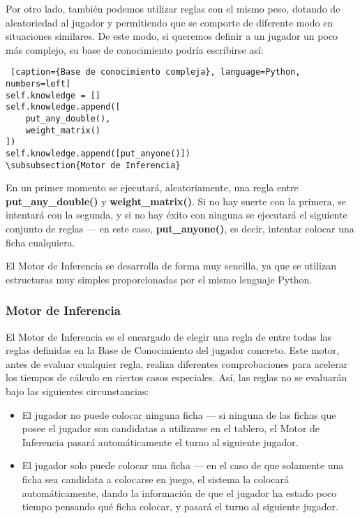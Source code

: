 Por otro lado, también podemos utilizar reglas con el mismo peso, dotando de aleatoriedad al jugador y permitiendo
que se comporte de diferente modo en situaciones similares. De este modo, si queremos definir a un jugador un poco
más complejo, su base de conocimiento podría escribirse así:

\begin{lstlisting} [caption={Base de conocimiento compleja}, language=Python, numbers=left]
self.knowledge = []
self.knowledge.append([
    put_any_double(),
    weight_matrix()
])
self.knowledge.append([put_anyone()])
\subsubsection{Motor de Inferencia}
\end{lstlisting}

En un primer momento se ejecutará, aleatoriamente, una regla entre \textbf{put\_any\_double()} y \textbf{weight\_matrix()}.
Si no hay suerte con la primera, se intentará con la segunda, y si no hay éxito con ninguna se ejecutará el siguiente
conjunto de reglas --- en este caso, \textbf{put\_anyone()}, es decir, intentar colocar una ficha cualquiera.

El Motor de Inferencia se desarrolla de forma muy sencilla, ya que se utilizan estructuras muy simples proporcionadas
por el mismo lenguaje Python. \\

\subsubsection{Motor de Inferencia}

El Motor de Inferencia es el encargado de elegir una regla de entre todas las reglas definidas en la Base de Conocimiento
del jugador concreto. Este motor, antes de evaluar cualquier regla, realiza diferentes comprobaciones para acelerar
los tiempos de cálculo en ciertos casos especiales. Así, las reglas no se evaluarán bajo las siguientes circunstancias:
\begin{itemize}
    \item El jugador no puede colocar ninguna ficha --- si ninguna de las fichas que posee el jugador son candidatas
        a utilizarse en el tablero, el Motor de Inferencia pasará automáticamente el turno al siguiente jugador.
    \item El jugador solo puede colocar una ficha ---  en el caso de que solamente una ficha sea candidata a colocarse
        en juego, el sistema la colocará automáticamente, dando la información de que el jugador ha estado poco tiempo
        pensando qué ficha colocar, y pasará el turno al siguiente jugador.
\end{itemize}

